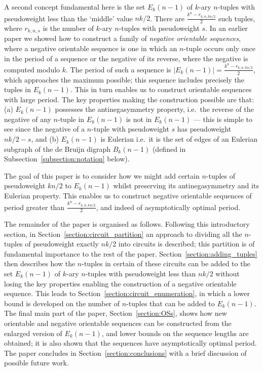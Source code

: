 \documentclass[a4paper,11pt]{article}
\theoremstyle{plain}
\theoremstyle{definition}
\theoremstyle{remark}
\begin{document}
A second concept fundamental here is the set $E_k(n-1)$ of $k$-ary $n$-tuples with pseudoweight
less than the `middle' value $nk/2$.  There are $\frac{k^n-r_{k,n,kn/2}}{2}$ such tuples, where
$r_{k,n,s}$ is the number of $k$-ary $n$-tuples with pseudoweight $s$. In an earlier paper
\cite{Mitchell26} we showed how to construct a family of \emph{negative orientable sequences},
where a negative orientable sequence is one in which an $n$-tuple occurs only once in the period of
a sequence or the negative of its reverse, where the negative is computed modulo $k$.  The period
of such a sequence is $|E_k(n-1)|=\frac{k^n-r_{k,n,kn/2}}{2}$, which approaches the maximum
possible; this sequence includes precisely the tuples in $E_k(n-1)$. This in turn enables us to
construct orientable sequences with large period. The key properties making the construction
possible are that: (a) $E_k(n-1)$ possesses the antinegasymmetry property, i.e.\ the reverse of the
negative of any $n$-tuple in $E_k(n-1)$ is not in $E_k(n-1)$ --- this is simple to see since the
negative of a $n$-tuple with pseudoweight $s$ has pseudoweight $nk/2-s$, and (b) $E_k(n-1)$ is
Eulerian i.e.\ it is the set of edges of an Eulerian subgraph of the de Bruijn digraph $B_k(n-1)$
(defined in Subsection~\ref{subsection:notation} below).


The goal of this paper is to consider how we might add certain $n$-tuples of pseudoweight $kn/2$ to
$E_k(n-1)$ whilst preserving its antinegasymmetry and its Eulerian property.  This enables us to
construct negative orientable sequences of period greater than
$\frac{k^n-r_{k,n,kn/2}}{2}$, and indeed of asymptotically optimal period.

The remainder of the paper is organised as follows.  Following this introductory section, in
Section~\ref{section:circuit_partition} an approach to dividing all the $n$-tuples of pseudoweight
exactly $nk/2$ into circuits is described; this partition is of fundamental importance to the rest
of the paper. Section~\ref{section:adding_tuples} then describes how the $n$-tuples in certain of
these circuits can be added to the set $E_k(n-1)$ of $k$-ary $n$-tuples with pseudoweight less than
$nk/2$ without losing the key properties enabling the construction of a negative orientable
sequence. This leads to Section~\ref{section:circuit_enumeration}, in which a lower bound is
developed on the number of $n$-tuples that can be added to $E_k(n-1)$. The final main part of the
paper, Section~\ref{section:OSs}, shows how new orientable and negative orientable sequences can be
constructed from the enlarged version of $E_k(n-1)$, and lower bounds on the sequence lengths are
obtained; it is also shown that the sequences have asymptotically optimal period. The paper
concludes in Section~\ref{section:conclusions} with a brief discussion of possible future work.
\end{document}
